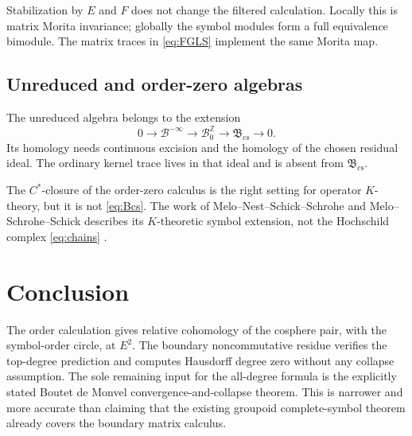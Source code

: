 \documentclass[11pt,oneside,reqno]{article}
\newcommand{\cB}{\mathcal B}
\newcommand{\Bcs}{\mathfrak B_{\mathrm{cs}}}
\theoremstyle{plain}
\theoremstyle{definition}
\theoremstyle{remark}
\begin{document}
Stabilization by \(E\) and \(F\) does not change the filtered calculation.
Locally this is matrix Morita invariance; globally the symbol modules form a
full equivalence bimodule. The matrix traces in \eqref{eq:FGLS} implement the
same Morita map.

\subsection{Unreduced and order-zero algebras}

The unreduced algebra belongs to the extension
\[
 0\longrightarrow\cB^{-\infty}
 \longrightarrow\cB^{\mathbb Z}_0
 \longrightarrow\Bcs\longrightarrow0.
\]
Its homology needs continuous excision and the homology of the chosen
residual ideal. The ordinary kernel trace lives in that ideal and is absent
from \(\Bcs\).

The \(C^*\)-closure of the order-zero calculus is the right setting for
operator \(K\)-theory, but it is not \eqref{eq:Bcs}. The work of
Melo--Nest--Schick--Schrohe and Melo--Schrohe--Schick describes its
\(K\)-theoretic symbol extension, not the Hochschild complex
\eqref{eq:chains} \cite{MNSS,MSS}.

\section{Conclusion}

The order calculation gives relative cohomology of the cosphere pair, with
the symbol-order circle, at \(E^2\). The boundary noncommutative residue
verifies the top-degree prediction and computes Hausdorff degree zero without
any collapse assumption. The sole remaining input for the all-degree formula
is the explicitly stated Boutet de Monvel convergence-and-collapse theorem.
This is narrower and more accurate than claiming that the existing groupoid
complete-symbol theorem already covers the boundary matrix calculus.
\end{document}
